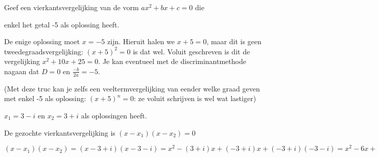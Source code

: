 \documentclass{ximera}
\begin{document}
\begin{exercise}
Geef een vierkantsvergelijking van de vorm $ax^2 + bx + c = 0$ die
\begin{question}
enkel het getal -5 als oplossing heeft.
\begin{oplossing}
De enige oplossing moet $x = -5$ zijn. Hieruit halen we $x + 5 = 0$, maar dit is geen tweedegraadsvergelijking: $(x+5)^2 = 0$ is dat wel. Voluit geschreven is dit de vergelijking $x^2 +10 x + 25 = 0$. Je kan eventueel met de discriminantmethode nagaan dat $D = 0$ en $\frac{-b}{2a} = -5$.

(Met deze truc kan je zelfs een veeltermvergelijking van eender welke graad geven met enkel -5 als oplossing: $(x+5)^n = 0$: ze voluit schrijven is wel wat lastiger)
\end{oplossing}
\end{question}

\begin{question}
$x_1 = 3-i$ en $x_2 = 3+i$ als oplossingen heeft.
%
\begin{hint}De gezochte vierkantsvergelijking is $(x-x_1)(x-x_2)=0$ \end{hint}
\begin{oplossing}
$(x-x_1)(x-x_2)=(x-3+i)(x-3-i)=x^2 -(3+i)x+(-3+i)x+(-3+i)(-3-i)=x^2-6x+10$
\end{oplossing}
\end{question}
\end{exercise}
\end{document}
